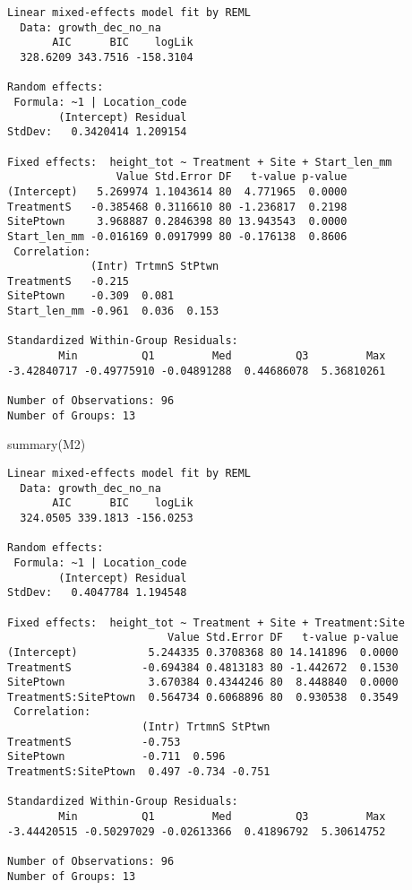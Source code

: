 \documentclass[
  letterpaper,
  DIV=11,
  numbers=noendperiod]{scrartcl}
\newenvironment{Shaded}{\begin{snugshade}}{\end{snugshade}}
\newcommand{\FunctionTok}[1]{\textcolor[rgb]{0.28,0.35,0.67}{#1}}
\newcommand{\NormalTok}[1]{\textcolor[rgb]{0.00,0.23,0.31}{#1}}
\begin{document}
\begin{verbatim}
Linear mixed-effects model fit by REML
  Data: growth_dec_no_na 
       AIC      BIC    logLik
  328.6209 343.7516 -158.3104

Random effects:
 Formula: ~1 | Location_code
        (Intercept) Residual
StdDev:   0.3420414 1.209154

Fixed effects:  height_tot ~ Treatment + Site + Start_len_mm 
                 Value Std.Error DF   t-value p-value
(Intercept)   5.269974 1.1043614 80  4.771965  0.0000
TreatmentS   -0.385468 0.3116610 80 -1.236817  0.2198
SitePtown     3.968887 0.2846398 80 13.943543  0.0000
Start_len_mm -0.016169 0.0917999 80 -0.176138  0.8606
 Correlation: 
             (Intr) TrtmnS StPtwn
TreatmentS   -0.215              
SitePtown    -0.309  0.081       
Start_len_mm -0.961  0.036  0.153

Standardized Within-Group Residuals:
        Min          Q1         Med          Q3         Max 
-3.42840717 -0.49775910 -0.04891288  0.44686078  5.36810261 

Number of Observations: 96
Number of Groups: 13 
\end{verbatim}

\begin{Shaded}
\begin{Highlighting}[]
\FunctionTok{summary}\NormalTok{(M2)}
\end{Highlighting}
\end{Shaded}

\begin{verbatim}
Linear mixed-effects model fit by REML
  Data: growth_dec_no_na 
       AIC      BIC    logLik
  324.0505 339.1813 -156.0253

Random effects:
 Formula: ~1 | Location_code
        (Intercept) Residual
StdDev:   0.4047784 1.194548

Fixed effects:  height_tot ~ Treatment + Site + Treatment:Site 
                         Value Std.Error DF   t-value p-value
(Intercept)           5.244335 0.3708368 80 14.141896  0.0000
TreatmentS           -0.694384 0.4813183 80 -1.442672  0.1530
SitePtown             3.670384 0.4344246 80  8.448840  0.0000
TreatmentS:SitePtown  0.564734 0.6068896 80  0.930538  0.3549
 Correlation: 
                     (Intr) TrtmnS StPtwn
TreatmentS           -0.753              
SitePtown            -0.711  0.596       
TreatmentS:SitePtown  0.497 -0.734 -0.751

Standardized Within-Group Residuals:
        Min          Q1         Med          Q3         Max 
-3.44420515 -0.50297029 -0.02613366  0.41896792  5.30614752 

Number of Observations: 96
Number of Groups: 13 
\end{verbatim}
\end{document}
